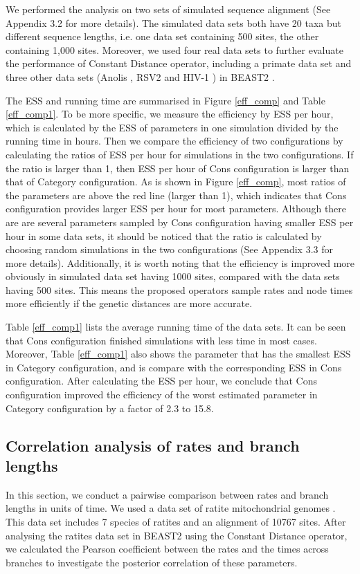 \documentclass{bmcart}
\begin{document}
We performed the analysis on two sets of simulated sequence alignment (See Appendix 3.2 for more details). The simulated data sets both have 20 taxa but different sequence lengths, i.e. one data set containing 500 sites, the other containing 1,000 sites. Moreover, we used four real data sets to further evaluate the performance of Constant Distance operator, including a primate data set \cite{finstermeier2013mitogenomic} and three other data sets (Anolis \cite{jackman1999phylogenetic}, RSV2 \cite{zlateva2004molecular,zlateva2005genetic} and HIV-1 \cite{shankarappa1999consistent}) in BEAST2 \cite{beast2data}.

The ESS and running time are summarised in Figure \ref{eff_comp} and Table \ref{eff_comp1}. To be more specific, we measure the efficiency by ESS per hour, which is calculated by the ESS of parameters in one simulation divided by the running time in hours. Then we compare the efficiency of two configurations by calculating the ratios of ESS per hour for simulations in the two configurations. If the ratio is larger than 1, then ESS per hour of Cons configuration is larger than that of Category configuration. As is shown in Figure \ref{eff_comp}, most ratios of the parameters are above the red line (larger than 1), which indicates that Cons configuration provides larger ESS per hour for most parameters. Although there are are several parameters sampled by Cons configuration having smaller ESS per hour in some data sets, it should be noticed that the ratio is calculated by choosing random simulations in the two configurations (See Appendix 3.3 for more details). Additionally, it is worth noting that the efficiency is improved more obviously in simulated data set having 1000 sites, compared with the data sets having 500 sites. This means the proposed operators sample rates and node times more efficiently if the genetic distances are more accurate. 

Table \ref{eff_comp1} lists the average running time of the data sets. It can be seen that Cons configuration finished simulations with less time in most cases. Moreover, Table \ref{eff_comp1} also shows the parameter that has the smallest ESS in Category configuration, and is compare with the corresponding ESS in Cons configuration. After calculating the ESS per hour, we conclude that Cons configuration improved the efficiency of the worst estimated parameter in Category configuration by a factor of 2.3 to 15.8. 

\subsection*{Correlation analysis of rates and branch lengths}
In this section, we conduct a pairwise comparison between rates and branch lengths in units of time. We used a data set of ratite mitochondrial genomes \cite{cooper2001complete}. This data set includes 7 species of ratites and an alignment of 10767 sites. After analysing the ratites data set in BEAST2 using the Constant Distance operator, we calculated the Pearson coefficient between the rates and the times across branches to investigate the posterior correlation of these parameters. 
\end{document}
